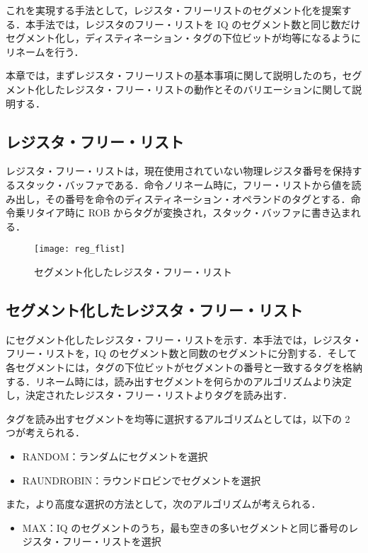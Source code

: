 これを実現する手法として，レジスタ・フリーリストのセグメント化を提案する．本手法では，レジスタのフリー・リストを IQ のセグメント数と同じ数だけセグメント化し，ディスティネーション・タグの下位ビットが均等になるようにリネームを行う．

本章では，まずレジスタ・フリーリストの基本事項に関して説明したのち，セグメント化したレジスタ・フリー・リストの動作とそのバリエーションに関して説明する．

\subsection{レジスタ・フリー・リスト}
レジスタ・フリー・リストは，現在使用されていない物理レジスタ番号を保持するスタック・バッファである．命令ノリネーム時に，フリー・リストから値を読み出し，その番号を命令のディスティネーション・オペランドのタグとする．命令乗リタイア時に ROB からタグが変換され，スタック・バッファに書き込まれる．

\begin{figure}[htb]
  \centering
  \texttt{[image: reg\_flist]}
  \caption{セグメント化したレジスタ・フリー・リスト}
  \label{fig:reg_flist}
\end{figure}

\subsection{セグメント化したレジスタ・フリー・リスト}
にセグメント化したレジスタ・フリー・リストを示す．本手法では，レジスタ・フリー・リストを，IQ のセグメント数と同数のセグメントに分割する．そして各セグメントには，タグの下位ビットがセグメントの番号と一致するタグを格納する．リネーム時には，読み出すセグメントを何らかのアルゴリズムより決定し，決定されたレジスタ・フリー・リストよりタグを読み出す．

タグを読み出すセグメントを均等に選択するアルゴリズムとしては，以下の 2 つが考えられる．
\begin{itemize}
  \item RANDOM：ランダムにセグメントを選択
  \item RAUNDROBIN：ラウンドロビンでセグメントを選択
\end{itemize}

また，より高度な選択の方法として，次のアルゴリズムが考えられる．
\begin{itemize}
  \item MAX：IQ のセグメントのうち，最も空きの多いセグメントと同じ番号のレジスタ・フリー・リストを選択
\end{itemize}


